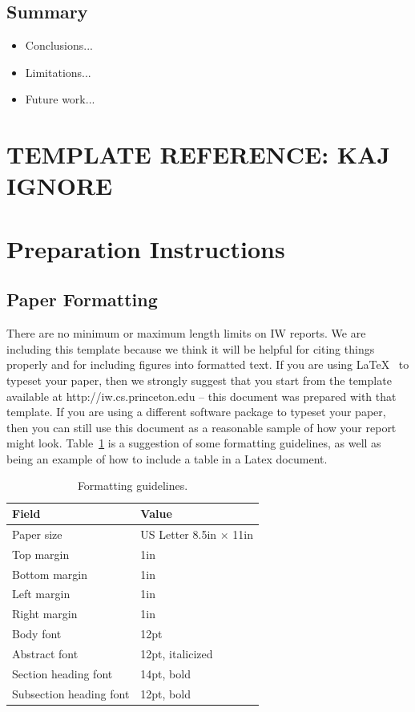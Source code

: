 \documentclass[pageno]{jpaper}
\begin{document}
\subsection{Summary}
\begin{itemize}
	\item Conclusions...
	\item Limitations...
	\item Future work...
\end{itemize}








\section{TEMPLATE REFERENCE: KAJ IGNORE}
\section{Preparation Instructions}

\subsection{Paper Formatting}
\label{section:formatting}

There are no minimum or maximum length limits on IW reports.  
We are including this template because we think it will be helpful
for citing things properly and for including figures into formatted
text.  If you are using \LaTeX~\cite{lamport94} 
to typeset your paper, then we strongly suggest
that you start from the template available at
http://iw.cs.princeton.edu -- this
document was prepared with that template.  
If you are using a different software package to typeset your paper, 
then you can still use this document as a reasonable sample of 
how your report might look.  Table~\ref{table:formatting} is a suggestion
of some formatting guidelines, as well as being an example of how to
include a table in a Latex document.

\begin{table}[hbt]
	\centering
	\begin{tabular}{|l|l|}
		\hline
		\textbf{Field} & \textbf{Value}\\
		\hline
		\hline
		Paper size & US Letter 8.5in $\times$ 11in\\
		\hline
		Top margin & 1in\\
		\hline
		Bottom margin & 1in\\
		\hline
		Left margin & 1in\\
		\hline
		Right margin & 1in\\
		\hline
		Body font & 12pt\\
		\hline
		Abstract font & 12pt, italicized\\
		\hline
		Section heading font & 14pt, bold\\
		\hline
		Subsection heading font & 12pt, bold\\
		\hline
	\end{tabular}
	\caption{Formatting guidelines. }
	\label{table:formatting}
\end{table}
\end{document}
